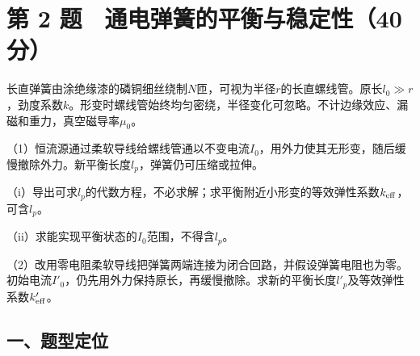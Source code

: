 \documentclass[12pt,a4paper,fontset=fandol]{ctexart}
\begin{document}
\clearpage

\section{第 2
题　通电弹簧的平衡与稳定性（40分）}\label{ux7b2c-2-ux9898-ux901aux7535ux5f39ux7c27ux7684ux5e73ux8861ux4e0eux7a33ux5b9aux602740ux5206}

长直弹簧由涂绝缘漆的磷铜细丝绕制\(N\)匝，可视为半径\(r\)的长直螺线管。原长\(l_0\gg r\)，劲度系数\(k\)。形变时螺线管始终均匀密绕，半径变化可忽略。不计边缘效应、漏磁和重力，真空磁导率\(\mu_0\)。

（1）恒流源通过柔软导线给螺线管通以不变电流\(I_0\)，用外力使其无形变，随后缓慢撤除外力。新平衡长度\(l_p\)，弹簧仍可压缩或拉伸。

（i）导出可求\(l_p\)的代数方程，不必求解；求平衡附近小形变的等效弹性系数\(k_{\rm eff}\)，可含\(l_p\)。

（ii）求能实现平衡状态的\(I_0\)范围，不得含\(l_p\)。

（2）改用零电阻柔软导线把弹簧两端连接为闭合回路，并假设弹簧电阻也为零。初始电流\(I'_0\)，仍先用外力保持原长，再缓慢撤除。求新的平衡长度\(l'_p\)及等效弹性系数\(k'_{\rm eff}\)。

\begin{center}
\begin{minipage}{\linewidth}
\centering\begingroup{}
\ifdim\wd\diagrambox>.88\linewidth
\sbox{\diagrambox}{\resizebox{.88\linewidth}{!}{\usebox{\diagrambox}}}\fi
\ifdim\ht\diagrambox>.38\textheight
\resizebox{!}{.38\textheight}{\usebox{\diagrambox}}
\else\usebox{\diagrambox}\fi
\par{}\endgroup\end{minipage}\end{center}

\subsection{一、题型定位}\label{ux4e00ux9898ux578bux5b9aux4f4d-1}
\end{document}
